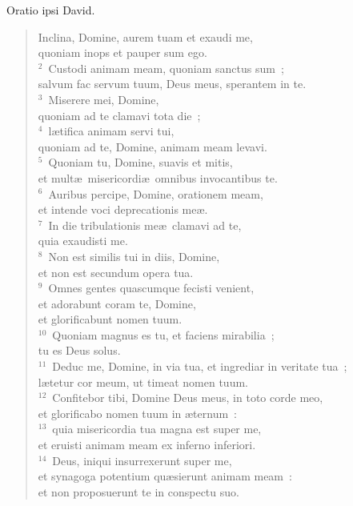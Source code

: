 \bchapter
\lettrine[lines=3,image=true,loversize=0.05,lraise=-0.03]{O}{}ratio ipsi David. \begin{flushleft}\begin{verse}\vspace{6pt}Inclina, Domine, aurem tuam et exaudi me,\\ quoniam inops et pauper sum ego.\\
${}^{2}$~Custodi animam meam, quoniam sanctus sum~;\\ salvum fac servum tuum, Deus meus, sperantem in te.\\
${}^{3}$~Miserere mei, Domine,\\ quoniam ad te clamavi tota die~;\\
${}^{4}$~l\ae tifica animam servi tui,\\ quoniam ad te, Domine, animam meam levavi.\\
${}^{5}$~Quoniam tu, Domine, suavis et mitis,\\ et mult\ae\ misericordi\ae\ omnibus invocantibus te.\\
${}^{6}$~Auribus percipe, Domine, orationem meam,\\ et intende voci deprecationis me\ae .\\
${}^{7}$~In die tribulationis me\ae\ clamavi ad te,\\ quia exaudisti me.\\
${}^{8}$~Non est similis tui in diis, Domine,\\ et non est secundum opera tua.\\
${}^{9}$~Omnes gentes quascumque fecisti venient,\\ et adorabunt coram te, Domine,\\ et glorificabunt nomen tuum.\\
${}^{10}$~Quoniam magnus es tu, et faciens mirabilia~;\\ tu es Deus solus.\\
${}^{11}$~Deduc me, Domine, in via tua, et ingrediar in veritate tua~;\\ l\ae tetur cor meum, ut timeat nomen tuum.\\
${}^{12}$~Confitebor tibi, Domine Deus meus, in toto corde meo,\\ et glorificabo nomen tuum in \ae ternum~:\\
${}^{13}$~quia misericordia tua magna est super me,\\ et eruisti animam meam ex inferno inferiori.\\
${}^{14}$~Deus, iniqui insurrexerunt super me,\\ et synagoga potentium qu\ae sierunt animam meam~:\\ et non proposuerunt te in conspectu suo.\\

\end{verse}
\end{flushleft}
